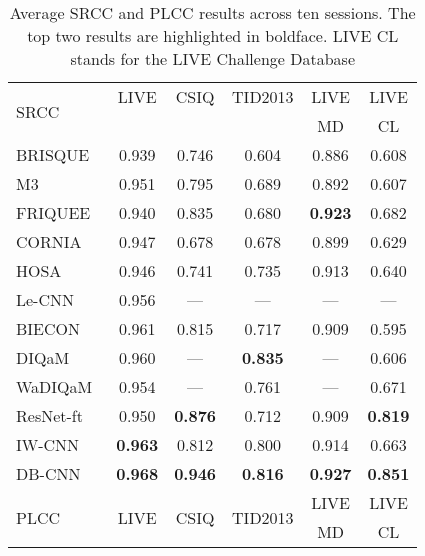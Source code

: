 \documentclass[journal]{IEEEtran}
\begin{document}
\begin{table}[t]
  \centering
  \caption{Average SRCC and PLCC results across ten sessions. The top two results are highlighted in boldface. LIVE CL stands for the LIVE Challenge Database}\label{tab:overall}
  \begin{tabular}{l|ccccc}
      \toprule
\multirow{2}{*}{SRCC} & LIVE & CSIQ& TID2013 & LIVE & LIVE\\
         & \cite{sheikh2006statistical} & \cite{larson2010most} & \cite{ponomarenko2013color} & MD \cite{Jayaraman2013Objective} & CL\cite{ghadiyaram2016massive}\\
     \hline

      BRISQUE~\cite{mittal2012no} & 0.939 & 0.746 & 0.604 & 0.886 & 0.608 \\
      M3~\cite{xue2014blind}& 0.951 & 0.795 & 0.689 & 0.892 & 0.607 \\
FRIQUEE~\cite{ghadiyaram2017perceptual} & 0.940 & 0.835 & 0.680 & {\bf 0.923} & 0.682\\
      CORNIA~\cite{ye2012unsupervised} & 0.947 & 0.678 & 0.678 & 0.899 & 0.629 \\
      HOSA~\cite{xu2016blind} & 0.946 & 0.741 & 0.735 & 0.913 & 0.640 \\
      Le-CNN~\cite{kang2014convolutional} &0.956 & --- & ---& --- & --- \\
BIECON~\cite{kim2017fully} & 0.961 & 0.815 & 0.717 & 0.909 & 0.595 \\
            DIQaM~\cite{bosse2016deep} & 0.960 & --- & {\bf 0.835} & --- & 0.606 \\
            WaDIQaM~\cite{bosse2016deep} & 0.954 & --- & 0.761 & --- & 0.671 \\
            ResNet-ft~\cite{kim2017deep} & 0.950 & {\bf 0.876} & 0.712 & 0.909 &{\bf 0.819} \\
            IW-CNN~\cite{kim2017deep} & {\bf 0.963} & 0.812 & 0.800 & 0.914 & 0.663 \\
     \hline
        DB-CNN& {\bf 0.968} & {\bf 0.946}& {\bf 0.816} & {\bf 0.927} &{\bf 0.851} \\
\midrule


                \multirow{2}{*}{PLCC} & \multirow{2}{*}{LIVE} & \multirow{2}{*}{CSIQ}& \multirow{2}{*}{TID2013} & LIVE & LIVE\\
         &  &  & & MD  & CL\\
     \hline


\end{tabular}
\end{table}
\end{document}
